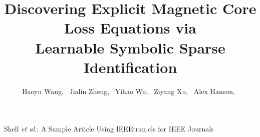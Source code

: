 \documentclass[lettersize,journal]{IEEEtran}
\begin{document}
\title{Discovering Explicit Magnetic Core Loss Equations via \\ Learnable Symbolic Sparse Identification}

\author{
    Haoyu Wang,~
    Jialin Zheng,~
    Yihao Wu,~
    Ziyang Xu,~
    Alex Hanson,~
  \vspace{-30pt}

}


%
{Shell \MakeLowercase{\textit{et al.}}: A Sample Article Using IEEEtran.cls for IEEE Journals}




\maketitle
\end{document}
